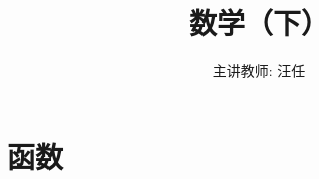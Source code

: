 \documentclass[12pt,xcolor={table}]{ctexbeamer}
\title{数学（下）}
\author{主讲教师: 汪任}
\institute{目前由张神星代课}
\begin{document}

\part{函数}





\end{document}
